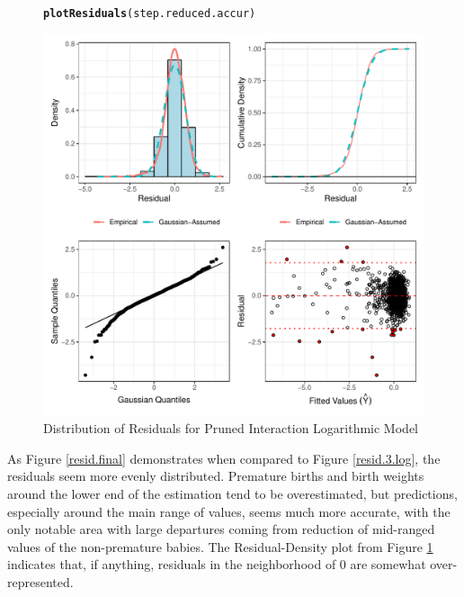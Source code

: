 \documentclass{article}\usepackage[]{graphicx}\usepackage[]{xcolor}
\makeatletter
\def\maxwidth{ %
  \ifdim\Gin@nat@width>\linewidth
    \linewidth
  \else
    \Gin@nat@width
  \fi
}
\newcommand{\hlstd}[1]{\textcolor[rgb]{0.345,0.345,0.345}{#1}}%
\newcommand{\hlkwd}[1]{\textcolor[rgb]{0.737,0.353,0.396}{\textbf{#1}}}%
\newenvironment{kframe}{%
 \def\at@end@of@kframe{}%
 \ifinner\ifhmode%
  \def\at@end@of@kframe{\end{minipage}}%
  \begin{minipage}{\columnwidth}%
 \fi\fi%
 \def\FrameCommand##1{\hskip\@totalleftmargin \hskip-\fboxsep
 \colorbox{shadecolor}{##1}\hskip-\fboxsep
     \hskip-\linewidth \hskip-\@totalleftmargin \hskip\columnwidth}%
 \MakeFramed {\advance\hsize-\width
   \@totalleftmargin\z@ \linewidth\hsize
   \@setminipage}}%
 {\par\unskip\endMakeFramed%
 \at@end@of@kframe}
\newenvironment{knitrout}{}{} %
\makeatother
\begin{document}
\begin{figure}
\begin{knitrout}
\color{fgcolor}\begin{kframe}
\begin{alltt}
\hlkwd{plotResiduals}\hlstd{(step.reduced.accur)}
\end{alltt}
\end{kframe}
\includegraphics[width=\maxwidth]{figure/unnamed-chunk-31-1} 
\end{knitrout}
\caption{Distribution of Residuals for Pruned Interaction Logarithmic Model}
\label{resid.plots.final}
\end{figure}

As Figure \ref{resid.final} demonstrates when compared to Figure \ref{resid.3.log}, the residuals seem more evenly distributed. Premature births and birth weights around the lower end of the estimation tend to be overestimated, but predictions, especially around the main range of values, seems much more accurate, with the only notable area with large departures coming from reduction of mid-ranged values of the non-premature babies. The Residual-Density plot from Figure \ref{resid.plots.final} indicates that, if anything, residuals in the neighborhood of 0 are somewhat over-represented.
\end{document}
